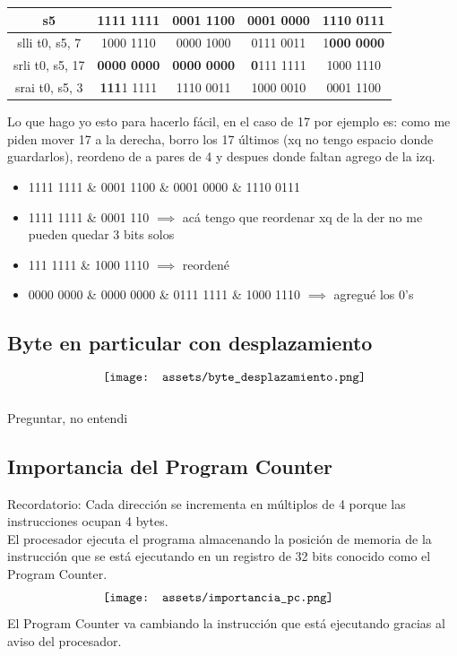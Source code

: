 \documentclass[10pt,a4paper]{article}
\begin{document}
\begin{table}[h!]
    \centering
    \begin{tabular}{|c | c | c | c| c|}
    \hline
    s5 & 1111 1111 & 0001 1100 & 0001 0000 & 1110 0111 \\ \hline
    slli t0, s5, 7 & 1000 1110 & 0000 1000 & 0111 0011 & 1\textbf{000 0000} \\ \hline
    srli t0, s5, 17 & \textbf{0000 0000} & \textbf{0000 0000} & \textbf{0}111 1111 & 1000 1110\\ \hline
    srai t0, s5, 3 & \textbf{111}1 1111 & 1110 0011 & 1000 0010 & 0001 1100\\ \hline
    \end{tabular}
    \label{tab:desplazamiento_riscv}
\end{table} 
Lo que hago yo esto para hacerlo fácil, en el caso de 17 por ejemplo es: como me piden mover 17 a la derecha, borro los 17 últimos (xq no tengo espacio donde guardarlos), reordeno de a pares de 4 y despues donde faltan agrego de la izq.
\begin{itemize}
\item 1111 1111 \& 0001 1100 \& 0001 0000 \& 1110 0111
\item 1111 1111 \& 0001 110 \(\implies\) acá tengo que reordenar xq de la der no me pueden quedar 3 bits solos
\item 111 1111 \& 1000 1110 \(\implies\) reordené
\item 0000 0000 \& 0000 0000 \& 0111 1111 \& 1000 1110 \(\implies\) agregué los 0's
\end{itemize}
\subsection*{Byte en particular con desplazamiento}
\[\begin{minipage}[b]{0.6\textwidth}
    \texttt{[image: assets/byte\_desplazamiento.png]}
    \label{fig:byte_desplazamiento}
\end{minipage}\] 
Preguntar, no entendi
\newpage 
\subsection*{Importancia del Program Counter}
Recordatorio: Cada dirección se incrementa en múltiplos de 4 porque las instrucciones ocupan 4 bytes. \\
El procesador ejecuta el programa almacenando la posición de memoria de la instrucción que se está ejecutando en un registro de 32 bits conocido como el Program Counter.
\[\begin{minipage}[b]{0.6\textwidth}
    \texttt{[image: assets/importancia\_pc.png]}
    \label{fig:importancia_pc}
\end{minipage}\] 
El Program Counter va cambiando la instrucción que está ejecutando gracias al aviso del procesador.
\end{document}
